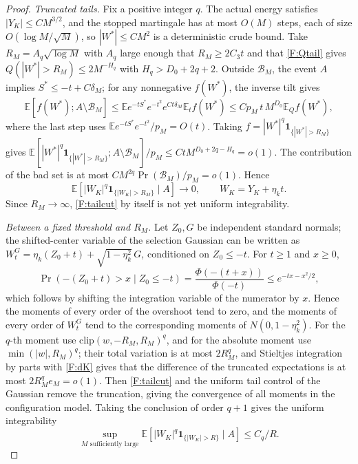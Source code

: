 \documentclass[a4paper,11pt]{article}
\numberwithin{equation}{section}
\newcommand{\E}{\mathbb E}
\begin{document}
\begin{proof}
\emph{Truncated tails.} Fix a positive integer $q$. The actual energy satisfies $|Y_K|\le CM^{3/2}$, and the
stopped martingale has at most $O(M)$ steps, each of size $O(\log M/\sqrt M)$, so $|W^*|\le CM^2$ is a
deterministic crude bound. Take $R_M=A_q\sqrt{\log M}$ with $A_q$ large enough that $R_M\ge2C_3t$ and that
\eqref{F:Qtail} gives $Q(|W^*|>R_M)\le2M^{-H_q}$ with $H_q>D_0+2q+2$. Outside $\mathcal B_M$, the event $A$
implies $S^*\le-t+C\delta_M$; for any nonnegative $f(W^*)$, the inverse tilt gives
\[
\E[f(W^*);A\setminus\mathcal B_M]\le\E e^{-tS^*}e^{-t^2}e^{Ct\delta_M}\E_tf(W^*)\le Cp_M\,t\,M^{D_0}\E_Qf(W^*),
\]
where the last step uses $\E e^{-tS^*}e^{-t^2}/p_M=O(t)$. Taking
$f=|W^*|^q\mathbf1_{\{|W^*|>R_M\}}$ gives
$\E[|W^*|^q\mathbf1_{\{|W^*|>R_M\}};A\setminus\mathcal B_M]/p_M\le CtM^{D_0+2q-H_q}=o(1)$. The contribution of
the bad set is at most $CM^{2q}\Pr(\mathcal B_M)/p_M=o(1)$. Hence
\begin{equation}
\E[|W_K|^q\mathbf1_{\{|W_K|>R_M\}}\mid A]\to0,\qquad W_K=Y_K+\eta_kt.\label{F:tailcut}
\end{equation}
Since $R_M\to\infty$, \eqref{F:tailcut} by itself is not yet uniform integrability.

\emph{Between a fixed threshold and $R_M$.} Let $Z_0,G$ be independent standard normals; the shifted-center
variable of the selection Gaussian can be written as
$W^G_t=\eta_k(Z_0+t)+\sqrt{1-\eta_k^2}\,G$, conditioned on $Z_0\le-t$. For $t\ge1$ and $x\ge0$,
\[
\Pr(-(Z_0+t)>x\mid Z_0\le-t)=\frac{\Phi(-(t+x))}{\Phi(-t)}\le e^{-tx-x^2/2},
\]
which follows by shifting the integration variable of the numerator by $x$. Hence the moments of every order of
the overshoot tend to zero, and the moments of every order of $W^G_t$ tend to the corresponding moments of
$N(0,1-\eta_k^2)$. For the $q$-th moment use $\mathrm{clip}(w,-R_M,R_M)^q$, and for the absolute moment use
$\min(|w|,R_M)^q$; their total variation is at most $2R_M^q$, and Stieltjes integration by parts with
\eqref{F:dK} gives that the difference of the truncated expectations is at most $2R_M^qe_M=o(1)$. Then
\eqref{F:tailcut} and the uniform tail control of the Gaussian remove the truncation, giving the convergence of
all moments in the configuration model. Taking the conclusion of order $q+1$ gives the uniform integrability
\begin{equation}
\sup_{M\text{ sufficiently large}}\E[|W_K|^q\mathbf1_{\{|W_K|>R\}}\mid A]\le C_q/R.\label{F:UI}
\end{equation}


\end{proof}
\end{document}
